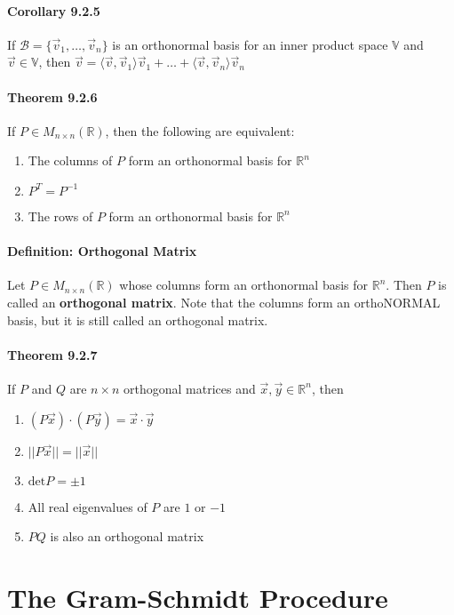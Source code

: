 \documentclass[10pt,letter]{article}
\begin{document}
\paragraph{Corollary 9.2.5}
If $\mathcal{B}=\{\vec{v}_1,\ldots,\vec{v}_n\}$ is an orthonormal basis for an inner product space $\mathbb{V}$ and $\vec{v}\in\mathbb{V}$, then $\vec{v}=\langle\vec{v},\vec{v}_1\rangle\vec{v}_1+\ldots+\langle\vec{v},\vec{v}_n\rangle\vec{v}_n$

\paragraph{Theorem 9.2.6}
If $P\in M_{n\times n}(\mathbb{R})$, then the following are equivalent: \begin{enumerate}
    \item The columns of $P$ form an orthonormal basis for $\mathbb{R}^n$ 
    \item $P^T=P^{-1}$ 
    \item The rows of $P$ form an orthonormal basis for $\mathbb{R}^n$
\end{enumerate}

\paragraph{Definition: Orthogonal Matrix}
Let $P\in M_{n\times n}(\mathbb{R})$ whose columns form an orthonormal basis for $\mathbb{R}^n$. Then $P$ is called an \textbf{orthogonal matrix}. Note that the columns form an orthoNORMAL basis, but it is still called an orthogonal matrix. 

\paragraph{Theorem 9.2.7}
If $P$ and $Q$ are $n\times n$ orthogonal matrices and $\vec{x},\vec{y}\in\mathbb{R}^n$, then 
\begin{enumerate}
    \item $(P\vec{x})\cdot(P\vec{y})=\vec{x}\cdot\vec{y}$ 
    \item $||P\vec{x}||=||\vec{x}||$ 
    \item $\text{det}P=\pm1$ 
    \item All real eigenvalues of $P$ are $1$ or $-1$ 
    \item $PQ$ is also an orthogonal matrix 
\end{enumerate}

\section*{The Gram-Schmidt Procedure}
\end{document}
